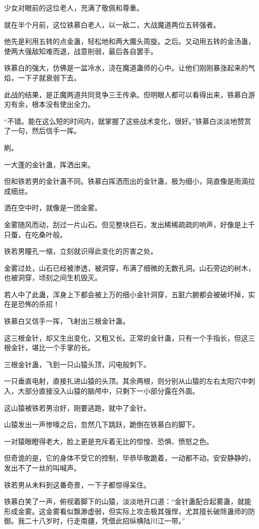 \begin{this_body}
少女对眼前的这位老人，充满了敬佩和尊重。

就在半个月前，这位铁慕白老人，以一敌二，大战魔道两位五转强者。

他先是利用五转的点金蛊，轻松地和两大魔头周旋。之后。又动用五转的金汤蛊，使两大强敌知难而退，战意削弱，最后各自罢手。

铁慕白的强大，仿佛是一盆冷水，浇在魔道蛊师的心中。让他们刚刚暴涨起来的气焰，一下子就衰弱下去。

此战的结果，是正魔两道共同竞争三王传承。但明眼人都可以看得出来，铁慕白游刃有余，根本没有使出全力。

“不错。能在这么短的时间内，就掌握了这些战术变化，很好。”铁慕白淡淡地赞赏了一句，然后信手一挥。

刷。

一大蓬的金针蛊，挥洒出来。

但和铁若男的金针蛊不同。铁慕白挥洒而出的金针蛊，极为细小，简直像是雨滴拉成细丝。

洒在空中时，就像是一团金雾。

金雾随风而动，刮过一片山石。但见整块巨石，发出稀稀疏疏的响声，好像是上千只蚕，在吃桑叶般。

铁若男瞳孔一缩，立刻就识得此变化的厉害之处。

金雾过处，山石已经被渗透，被洞穿，布满了细微的无数孔洞。山石旁边的树木，也被洞穿，顷刻之间生机毁灭。

若人中了此蛊，浑身上下都会被上万的细小金针洞穿，五脏六腑都会被破坏掉，实在是恐怖的杀招！

铁慕白又信手一挥，飞射出三根金针蛊。

这三根金针，却又生出变化，又粗又长。正常的金针蛊，只有一个手指长，但这三根金针，堪比一个手掌的长。

三根金针蛊，飞到一只山猿头顶，闪电般刺下。

一只垂直电射，直接扎进山猿的头顶。其余两根，则分别从山猿的左右太阳穴中刺入，大部分直接没入山猿的脑颅中，只剩下一小部分露在外面。

这山猿被铁若男治好，刚要逃跑，就中了金针。

山猿发出一声惨嚎之后，忽然几下跳跃，跪倒在铁慕白的脚下。

一对猿眼瞪得老大，脸上更是充斥着无比的惊惶、恐惧、愤怒之色。

但奇诡的是，它的身体不受它的控制，毕恭毕敬跪着，一动都不动。安安静静的，发出不了一丝的叫喊声。

铁若男从未料到这番奇景，一下子都惊得呆住。

铁慕白笑了一声，俯视着脚下的山猿，淡淡地开口道：“金针蛊配合起雾蛊，就能形成金雾。这金雾看似飘渺虚弱，但实际上攻击极其强悍，尤其擅长破除蛊师的防御。我二十八岁时，行走南疆，凭借此招纵横陆川江一带。”


\end{this_body}
